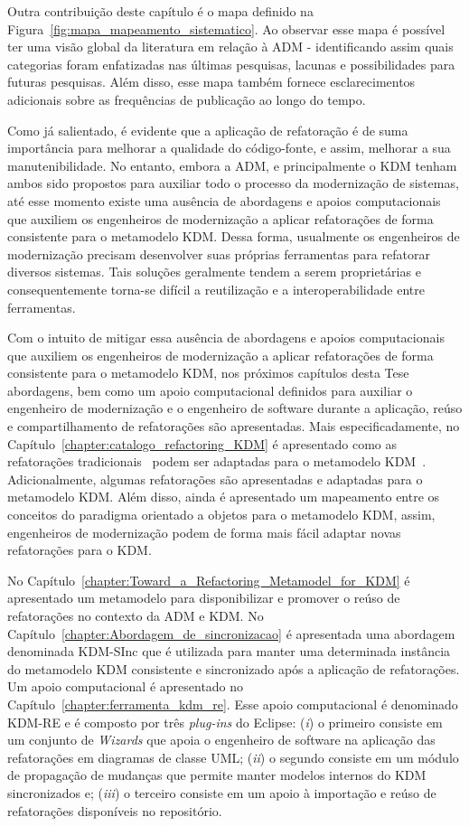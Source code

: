 Outra contribuição deste capítulo é o mapa definido na Figura~\ref{fig:mapa_mapeamento_sistematico}. Ao observar esse mapa é possível ter uma visão global da literatura em relação à ADM - identificando assim quais categorias foram enfatizadas nas últimas pesquisas, lacunas e possibilidades para futuras pesquisas. Além disso, esse mapa também fornece esclarecimentos adicionais sobre as frequências de publicação ao longo do tempo.

Como já salientado, é evidente que a aplicação de refatoração é de suma importância para melhorar a qualidade do código-fonte, e assim, melhorar a sua manutenibilidade.
No entanto, embora a ADM, e principalmente o KDM tenham ambos sido propostos para auxiliar todo o processo da modernização de sistemas, até esse momento existe uma ausência de abordagens e apoios computacionais que auxiliem os engenheiros de modernização a aplicar refatorações de forma consistente para o metamodelo KDM. Dessa forma, usualmente os engenheiros de modernização precisam desenvolver suas próprias ferramentas para refatorar diversos sistemas. Tais soluções geralmente tendem a serem proprietárias e consequentemente torna-se difícil a reutilização e a interoperabilidade entre ferramentas. 

Com o intuito de mitigar essa ausência de abordagens e apoios computacionais que auxiliem os engenheiros de modernização a aplicar refatorações de forma consistente para o metamodelo KDM, nos próximos capítulos desta Tese abordagens, bem como um apoio computacional definidos para auxiliar o engenheiro de modernização e o engenheiro de software durante a aplicação, reúso e compartilhamento de refatorações são apresentadas. Mais especificadamente, no Capítulo~\ref{chapter:catalogo_refactoring_KDM} é apresentado como as refatorações tradicionais~\cite{Fowler1999} podem ser adaptadas para o metamodelo KDM~\cite{durelli_catalogo, durelli_VEM_ferramenta}. Adicionalmente, algumas refatorações são apresentadas e adaptadas para o metamodelo KDM. Além disso, ainda é apresentado um mapeamento entre os conceitos do paradigma orientado a objetos para o metamodelo KDM, assim, engenheiros de modernização podem de forma mais fácil adaptar novas refatorações para o KDM.

No Capítulo~\ref{chapter:Toward_a_Refactoring_Metamodel_for_KDM} é apresentado um metamodelo para disponibilizar e promover o reúso de refatorações no contexto da ADM e KDM. No Capítulo~\ref{chapter:Abordagem_de_sincronizacao} é apresentada uma abordagem denominada KDM-SInc que é utilizada para manter uma determinada instância do metamodelo KDM consistente e sincronizado após a aplicação de refatorações. Um apoio computacional é apresentado no Capítulo~\ref{chapter:ferramenta_kdm_re}. Esse apoio computacional é denominado KDM-RE e é composto por três \textit{plug-ins} do Eclipse: (\textit{i}) o primeiro consiste em um conjunto de \textit{Wizards} que apoia o engenheiro de software na aplicação das refatorações em diagramas de classe UML; (\textit{ii}) o segundo consiste em um módulo de propagação de mudanças que permite manter modelos internos do KDM sincronizados e; (\textit{iii}) o terceiro consiste em um apoio à importação e reúso de refatorações disponíveis no repositório.